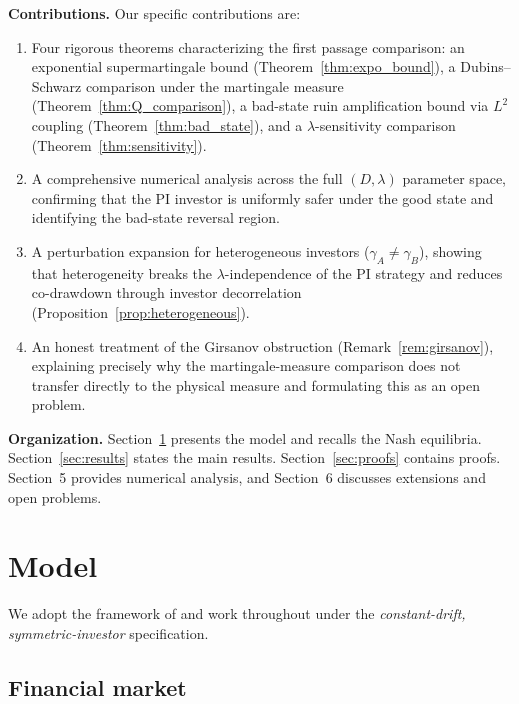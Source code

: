 \documentclass[12pt]{article}
\theoremstyle{remark}
\theoremstyle{definition}
\begin{document}
\medskip
\noindent\textbf{Contributions.}
Our specific contributions are:
\begin{enumerate}[label=\arabic*.]
\item Four rigorous theorems characterizing the first passage
  comparison: an exponential supermartingale bound
  (Theorem~\ref{thm:expo_bound}), a Dubins--Schwarz comparison under
  the martingale measure (Theorem~\ref{thm:Q_comparison}),
  a bad-state ruin amplification bound via $L^2$ coupling
  (Theorem~\ref{thm:bad_state}), and a $\lambda$-sensitivity
  comparison (Theorem~\ref{thm:sensitivity}).
\item A comprehensive numerical analysis across the full
  $(D, \lambda)$ parameter space, confirming that the PI investor is
  uniformly safer under the good state and identifying the bad-state
  reversal region.
\item A perturbation expansion for heterogeneous investors
  ($\gamma_A \neq \gamma_B$), showing that heterogeneity breaks the
  $\lambda$-independence of the PI strategy and reduces co-drawdown
  through investor decorrelation
  (Proposition~\ref{prop:heterogeneous}).
\item An honest treatment of the Girsanov obstruction
  (Remark~\ref{rem:girsanov}), explaining precisely why the
  martingale-measure comparison does not transfer directly to the
  physical measure and formulating this as an open problem.
\end{enumerate}

\medskip
\noindent\textbf{Organization.}
Section~\ref{sec:model} presents the model and recalls the Nash
equilibria.
Section~\ref{sec:results} states the main results.
Section~\ref{sec:proofs} contains proofs.
Section~5 provides numerical analysis, and
Section~6 discusses extensions and open problems.

\section{Model}\label{sec:model}

We adopt the framework of \citet{HuangSun2025} and work throughout
under the \emph{constant-drift, symmetric-investor} specification.

\subsection{Financial market}\label{sec:market}
\end{document}
